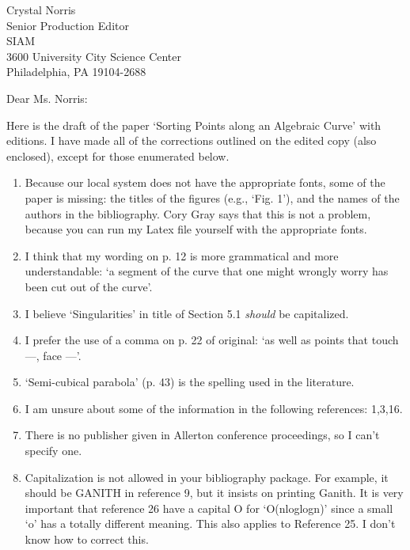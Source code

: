 \signature{John K. Johnstone}

\begin{letter}
{Crystal Norris\\
Senior Production Editor\\
SIAM\\
3600 University City Science Center\\
Philadelphia, PA  19104-2688}

\opening{Dear Ms. Norris:}

Here is the draft of the paper `Sorting Points along an Algebraic Curve' 
with editions.
I have made all of the corrections outlined on the edited copy (also enclosed),
except for those enumerated below.


\begin{enumerate}
\item
Because our local system does not have the appropriate fonts,
some of the paper is missing: the titles of the figures (e.g., `Fig. 1'),
and the names of the authors in the bibliography.
Cory Gray says that this is not a problem, because you can run my 
Latex file yourself with the appropriate fonts.
\item
I think that my wording on p. 12 is more grammatical and more understandable:
`a segment of the curve that one might wrongly worry has been cut out of the curve'.
\item
I believe `Singularities' in title of Section 5.1 {\em should} be capitalized.
\item
I prefer the use of a comma on p. 22 of original: `as well as points that touch
	 ---, face ---'.
\item
`Semi-cubical parabola' (p. 43) is the spelling used in the literature.
\item
I am unsure about some of the information in the following references: 1,3,16.
\item
There is no publisher given in Allerton conference proceedings, so I can't specify one.
\item
Capitalization is not allowed in your bibliography package.
For example, it should be GANITH in reference 9, but it insists on printing Ganith.
It is very important that reference 26 have a capital O for `O(nloglogn)' since
a small `o' has a totally different meaning.
This also applies to Reference 25.
I don't know how to correct this.
\end{enumerate}


\end{letter}
